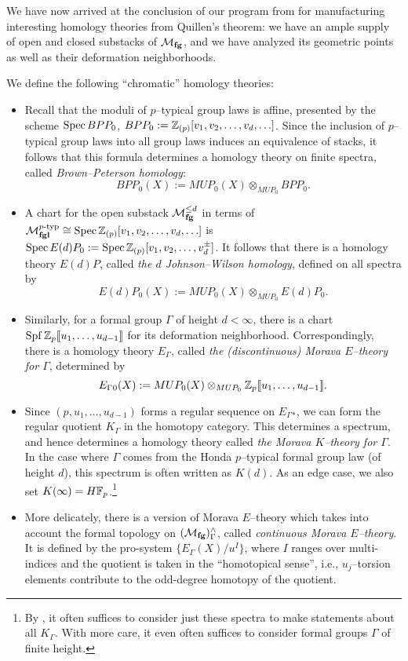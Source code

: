We have now arrived at the conclusion of our program from  for manufacturing interesting homology theories from Quillen's theorem: we have an ample supply of open and closed substacks of $\mathcal{M}_{\mathbf{fg}}$, and we have analyzed its geometric points as well as their deformation neighborhoods.
\begin{definition}
We define the following ``chromatic'' homology theories:
\begin{itemize}
\item Recall that the moduli of $p$--typical group laws is affine, presented by the scheme $\operatorname{Spec} BPP_0$, $BPP_0 := \mathbb Z_{(p)}[v_1, v_2, \ldots, v_d, \ldots]$.  Since the inclusion of $p$--typical group laws into all group laws induces an equivalence of stacks, it follows that this formula determines a homology theory on finite spectra, called \textit{Brown--Peterson homology}: \[BPP_0(X) := MUP_0(X) \otimes_{MUP_0} BPP_0.\]
\item A chart for the open substack $\mathcal{M}_{\mathbf{fg}}^{\le d}$ in terms of $\mathcal{M}_{\mathbf{fgl}}^{p\text{-}\mathrm{typ}} \cong \operatorname{Spec} \mathbb Z_{(p)}[v_1, v_2, \ldots, v_d, \ldots]$ is $\operatorname{Spec} E(d)P_0 := \operatorname{Spec} \mathbb Z_{(p)}[v_1, v_2, \ldots, v_d^\pm]$.  It follows that there is a homology theory $E(d)P$, called \textit{the $d${\th} Johnson--Wilson homology}, defined on all spectra by \[E(d)P_0(X) := MUP_0(X) \otimes_{MUP_0} E(d)P_0.\]
\item Similarly, for a formal group $\Gamma$ of height $d < \infty$, there is a chart $\operatorname{Spf} \mathbb Z_p\llbracket{u_1, \ldots, u_{d-1}}\rrbracket$ for its deformation neighborhood.  Correspondingly, there is a homology theory $E_\Gamma{}$, called \textit{the (discontinuous) Morava $E$--theory for $\Gamma$}, determined by \[E_\Gamma{}_0(X) := MUP_0(X) \otimes_{MUP_0} \mathbb Z_p\llbracket{u_1, \ldots, u_{d-1}}\rrbracket.\] 
\item Since $(p, u_1, \ldots, u_{d-1})$ forms a regular sequence on $E_\Gamma{}_*$, we can form the regular quotient $K_\Gamma$ in the homotopy category.  This determines a spectrum, and hence determines a homology theory called \textit{the Morava $K$--theory for $\Gamma$}.  In the case where $\Gamma$ comes from the Honda $p$--typical formal group law (of height $d$), this spectrum is often written as $K(d)$.  As an edge case, we also set $K(\infty) = H\mathbb F_p$.\footnote{By , it often suffices to consider just these spectra to make statements about all $K_\Gamma$.  With more care, it even often suffices to consider formal groups $\Gamma$ of finite height.}
\item More delicately, there is a version of Morava $E$--theory which takes into account the formal topology on $(\mathcal{M}_{\mathbf{fg}})^\wedge_\Gamma$, called \textit{continuous Morava $E$--theory}.  It is defined by the pro-system $\{E_\Gamma(X) / u^I\}$, where $I$ ranges over multi-indices and the quotient is taken in the ``homotopical sense'', i.e., $u_j$--torsion elements contribute to the odd-degree homotopy of the quotient.

\end{itemize}
\end{definition}
